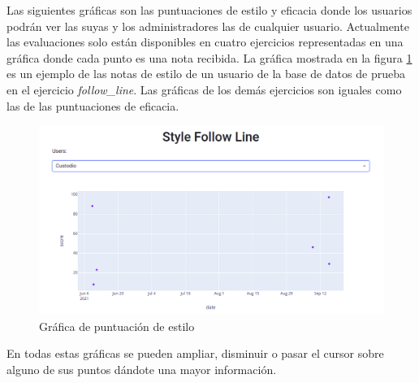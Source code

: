 \newpage
Las siguientes gráficas son las puntuaciones de estilo y eficacia donde los usuarios podrán ver las suyas y los administradores las de cualquier usuario. Actualmente las evaluaciones solo están disponibles en cuatro ejercicios representadas en una gráfica donde cada punto es una nota recibida. La gráfica mostrada en la figura \ref{fig:score} es un ejemplo de las notas de estilo de un usuario de la base de datos de prueba en el ejercicio \textit{follow\_line}. Las gráficas de los demás ejercicios son iguales como las de las puntuaciones de eficacia.



\begin{figure}[H]
    \centering
    \includegraphics[width=17cm, keepaspectratio]{img/score.png}
    \caption{Gráfica de puntuación de estilo}
    \label{fig:score}
\end{figure}

En todas estas gráficas se pueden ampliar, disminuir o pasar el cursor sobre alguno de sus puntos dándote una mayor información.









